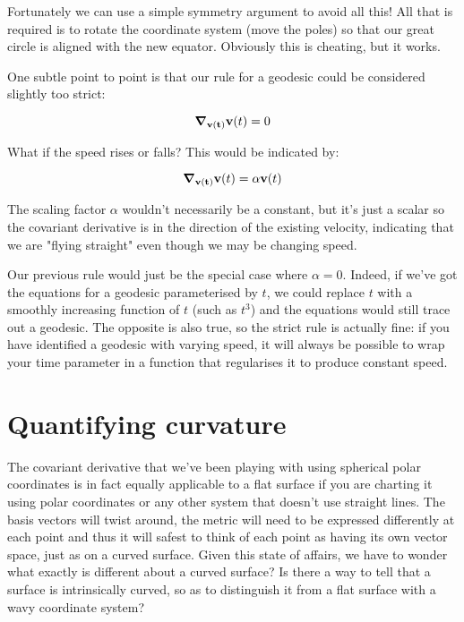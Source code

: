 Fortunately we can use a simple symmetry argument to avoid all this! All that is required is to rotate the coordinate system (move the poles) so that our great circle is aligned with the new equator. Obviously this is cheating, but it works.

One subtle point to point is that our rule for a geodesic could be considered slightly too strict:

$$
\grad_{\mathbf{v(t)}} \mathbf{v}(t) = 0
$$

What if the speed rises or falls? This would be indicated by:

$$
\grad_{\mathbf{v(t)}} \mathbf{v}(t) = \alpha \mathbf{v}(t)
$$

The scaling factor $\alpha$ wouldn't necessarily be a constant, but it's just a scalar so the covariant derivative is in the direction of the existing velocity, indicating that we are "flying straight" even though we may be changing speed.

Our previous rule would just be the special case where $\alpha = 0$. Indeed, if we've got the equations for a geodesic parameterised by $t$, we could replace $t$ with a smoothly increasing function of $t$ (such as $t^3$) and the equations would still trace out a geodesic. The opposite is also true, so the strict rule is actually fine: if you have identified a geodesic with varying speed, it will always be possible to wrap your time parameter in a function that regularises it to produce constant speed.

\section{Quantifying curvature}

The covariant derivative that we've been playing with using spherical polar coordinates is in fact equally applicable to a flat surface if you are charting it using polar coordinates or any other system that doesn't use straight lines. The basis vectors will twist around, the metric will need to be expressed differently at each point and thus it will safest to think of each point as having its own vector space, just as on a curved surface. Given this state of affairs, we have to wonder what exactly is different about a curved surface? Is there a way to tell that a surface is intrinsically curved, so as to distinguish it from a flat surface with a wavy coordinate system?
